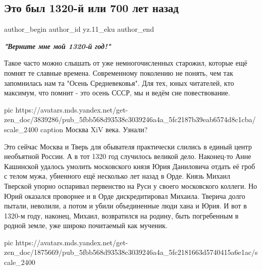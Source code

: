  
 
 
 
 
 
\subsection{Это был 1320-й или 700 лет назад}
\label{sec:02_12_2020.sites.ru.zen_yandex.yz.11_eku.1.1320_700_let_nazad}
\ifcmt
	author_begin
   author_id yz.11_eku
	author_end
\fi

\begin{leftbar}
  \begingroup
    \em\Large\bfseries\color{blue}
"Верните мне мой 1320-й год!"
  \endgroup
\end{leftbar}

Такое часто можно слышать от уже немногочисленных старожил, которые ещё помнят
те славные времена. Современному поколению не понять, чем так запомнилась нам
та "Осень Средневековья". Для тех, юных читателей, кто максимум, что помнит -
это осень СССР, мы и ведём сие повествование.

\ifcmt
pic https://avatars.mds.yandex.net/get-zen_doc/3839286/pub_5fbb568d93538c3039246a4a_5fc2187b39eab6574d8c1cba/scale_2400
caption Москва XiV века. Узнали?
\fi

Это сейчас Москва и Тверь для обывателя практически слились в единый центр
необъятной России. А в тот 1320 год случилось великой дело. Наконец-то Анне
Кашинской удалось умолить московского князя Юрия Даниловича отдать её гроб с
телом мужа, убиенного ещё несколько лет назад в Орде. Князь Михаил Тверской
упорно оспаривал первенство на Руси у своего московского коллеги. Но Юрий
оказался проворнее и в Орде дискредитировал Михаила. Тверича долго пытали,
неволили, а потом и убили объединенные люди хана и Юрия. И вот в 1320-м году,
наконец, Михаил, возвратился на родину, быть погребенным в родной земле, уже
широко почитаемый как мученик. 

\ifcmt
pic https://avatars.mds.yandex.net/get-zen_doc/1875669/pub_5fbb568d93538c3039246a4a_5fc2181663d5740415a6e1ac/scale_2400
\fi

